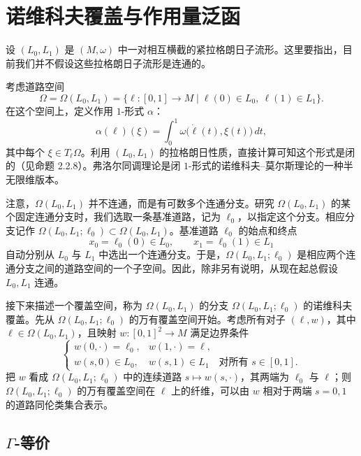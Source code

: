 
\section{诺维科夫覆盖与作用量泛函}
\label{sec:2-2}

设 $(L_0,L_1)$ 是 $(M,\omega)$ 中一对相互横截的紧拉格朗日子流形。这里要指出，目前我们并不假设这些拉格朗日子流形是连通的。

考虑道路空间
\[
  \Omega=\Omega(L_0,L_1)
  =\{\ell:[0,1]\longrightarrow M
    \mid \ell(0)\in L_0,\ \ell(1)\in L_1\}.
\]
在这个空间上，定义作用 $1$-形式 $\alpha$：
\begin{equation}
  \alpha(\ell)(\xi)
  =\int_0^1\omega\bigl(\dot\ell(t),\xi(t)\bigr)\,dt,
  \tag{2.2.1}\label{eq:2-2-1}
\end{equation}
其中每个 $\xi\in T_\ell\Omega$。利用 $(L_0,L_1)$ 的拉格朗日性质，直接计算可知这个形式是闭的（见命题 2.2.8）。弗洛尔同调理论是闭 $1$-形式的诺维科夫--莫尔斯理论的一种半无限维版本。

注意，$\Omega(L_0,L_1)$ 并不连通，而是有可数多个连通分支。研究 $\Omega(L_0,L_1)$ 的某个固定连通分支时，我们选取一条基准道路，记为 $\ell_0$，以指定这个分支。相应分支记作
$\Omega(L_0,L_1;\ell_0)\subset\Omega(L_0,L_1)$。基准道路 $\ell_0$ 的始点和终点
\[
  x_0=\ell_0(0)\in L_0,
  \qquad
  x_1=\ell_0(1)\in L_1
\]
自动分别从 $L_0$ 与 $L_1$ 中选出一个连通分支。于是，$\Omega(L_0,L_1;\ell_0)$ 是相应两个连通分支之间的道路空间的一个子空间。因此，除非另有说明，从现在起总假设 $L_0,L_1$ 连通。

接下来描述一个覆盖空间，称为 $\Omega(L_0,L_1)$ 的分支 $\Omega(L_0,L_1;\ell_0)$ 的诺维科夫覆盖。先从 $\Omega(L_0,L_1;\ell_0)$ 的万有覆盖空间开始。考虑所有对子 $(\ell,w)$，其中 $\ell\in\Omega(L_0,L_1)$，且映射 $w:[0,1]^2\to M$ 满足边界条件
\begin{equation}
  \begin{cases}
    w(0,\mathord\cdot)=\ell_0,
      &w(1,\mathord\cdot)=\ell,\\
    w(s,0)\in L_0,
      &w(s,1)\in L_1\quad\text{对所有 }s\in[0,1].
  \end{cases}
  \tag{2.2.2}\label{eq:2-2-2}
\end{equation}
把 $w$ 看成 $\Omega(L_0,L_1;\ell_0)$ 中的连续道路 $s\mapsto w(s,\mathord\cdot)$，其两端为 $\ell_0$ 与 $\ell$；则 $\Omega(L_0,L_1;\ell_0)$ 的万有覆盖空间在 $\ell$ 上的纤维，可以由 $w$ 相对于两端 $s=0,1$ 的道路同伦类集合表示。

\subsection{\texorpdfstring{$\Gamma$}{Gamma}-等价}
\label{sec:2-2-1}

